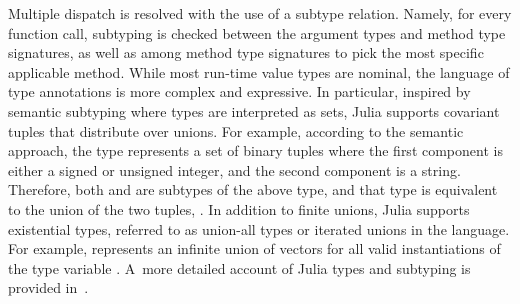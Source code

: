 
Multiple dispatch is resolved with the use of a subtype relation.
Namely, for every function call, subtyping is checked between
the argument types and method type signatures,
as well as among method type signatures
to pick the most specific applicable method.
While most run-time value types are nominal, %
the language of type annotations is more complex and expressive. 
In particular, inspired by semantic subtyping
where types are interpreted as sets,
Julia supports covariant tuples that distribute over unions.
For example, according to the semantic approach, the type 
 represents a set of binary
tuples where the first component is either a signed or unsigned integer,
and the second component is a string. Therefore, both
 and  are subtypes
of the above type, and that type is equivalent to the union of the two
tuples, .
In addition to finite unions, Julia supports existential types, referred to as
union-all types or iterated unions in the language. 
For example, 
represents an infinite union of vectors  for all valid
instantiations  of the type variable .
A~more detailed account of Julia types and subtyping
is provided in~.

